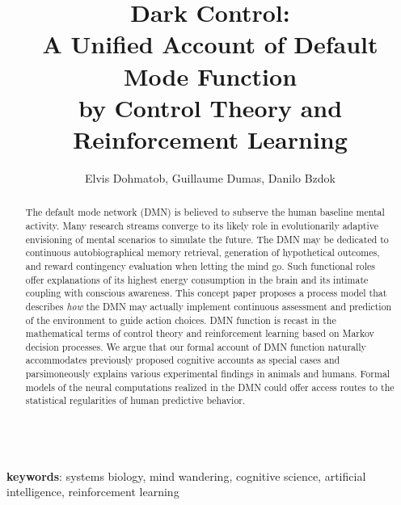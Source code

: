 \documentclass[10pt,letterpaper]{article}
\date{}
\title{Dark Control:\\
       A Unified Account of Default Mode Function\\
       by Control Theory and Reinforcement Learning}
\begin{document}
\author{Elvis Dohmatob, Guillaume Dumas, Danilo Bzdok\\
}

\maketitle


\begin{abstract}
The default mode network (DMN) is believed to subserve the human
baseline mental activity.
%
Many research streams converge to its likely role in evolutionarily adaptive
envisioning of mental scenarios to simulate the future.
The DMN may be dedicated to continuous autobiographical memory retrieval,
generation of hypothetical outcomes,
and reward contingency evaluation when letting the mind go.
Such functional roles offer explanations of
its highest energy consumption in the brain and
its intimate coupling with conscious awareness.
%
This concept paper proposes a process model that describes
\textit{how} the DMN may actually implement continuous
assessment and prediction of the environment to guide action choices.
DMN function is recast in the mathematical terms of
control theory and reinforcement learning based on Markov decision processes.
We argue that our formal account of DMN function
naturally accommodates previously proposed cognitive accounts as special cases and
parsimoneously explains various experimental findings in animals and humans.
%
Formal models of the neural computations realized in the DMN
could offer access routes to the statistical regularities
of human predictive behavior.
\end{abstract}

\textbf{\\keywords}: systems biology, mind wandering, cognitive science,
artificial intelligence,
reinforcement learning

\tableofcontents
\listoffigures
\listoftables
\end{document}
